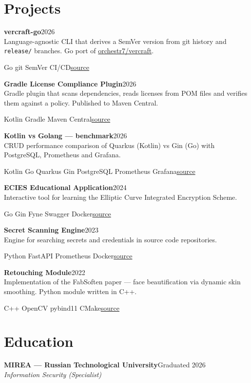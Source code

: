 \documentclass[a4paper,10pt]{article}
\newcommand{\role}[3]{%
  \vspace{0.22em}%
  \textbf{#1}\hfill{\small\color{muted}#3}\\%
  {\small\itshape #2}\par\vspace{0.1em}}
\newcommand{\project}[5]{%
  \vspace{0.16em}%
  \textbf{#1}\hfill{\small\color{muted}#2}\\%
  {\small #3}\par
  {\footnotesize\textcolor{muted}{#4}\hfill\href{#5}{source}}\par}
\begin{document}
\section*{Projects}

\project{vercraft-go}{2026}
  {Language-agnostic CLI that derives a SemVer version from git history and \texttt{release/} branches. Go port of \href{https://github.com/orchestr7/vercraft}{orchestr7/vercraft}.}
  {Go \textperiodcentered{} git \textperiodcentered{} SemVer \textperiodcentered{} CI/CD}
  {https://github.com/axidex/vercraft-go}

\project{Gradle License Compliance Plugin}{2026}
  {Gradle plugin that scans dependencies, reads licenses from POM files and verifies them against a policy. Published to Maven Central.}
  {Kotlin \textperiodcentered{} Gradle \textperiodcentered{} Maven Central}
  {https://github.com/axidex/gradle-licenses}

\project{Kotlin vs Golang --- benchmark}{2026}
  {CRUD performance comparison of Quarkus (Kotlin) vs Gin (Go) with PostgreSQL, Prometheus and Grafana.}
  {Kotlin \textperiodcentered{} Go \textperiodcentered{} Quarkus \textperiodcentered{} Gin \textperiodcentered{} PostgreSQL \textperiodcentered{} Prometheus \textperiodcentered{} Grafana}
  {https://github.com/axidex/kotlin-golang-benchmark}

\project{ECIES Educational Application}{2024}
  {Interactive tool for learning the Elliptic Curve Integrated Encryption Scheme.}
  {Go \textperiodcentered{} Gin \textperiodcentered{} Fyne \textperiodcentered{} Swagger \textperiodcentered{} Docker}
  {https://github.com/axidex/elliptic}

\project{Secret Scanning Engine}{2023}
  {Engine for searching secrets and credentials in source code repositories.}
  {Python \textperiodcentered{} FastAPI \textperiodcentered{} Prometheus \textperiodcentered{} Docker}
  {https://github.com/axidex/ss-engine}

\project{Retouching Module}{2022}
  {Implementation of the FabSoften paper --- face beautification via dynamic skin smoothing. Python module written in C++.}
  {C++ \textperiodcentered{} OpenCV \textperiodcentered{} pybind11 \textperiodcentered{} CMake}
  {https://github.com/axidex/Retouching-module}

\section*{Education}
\role{MIREA --- Russian Technological University}{Information Security (Specialist)}{Graduated 2026}
\end{document}

